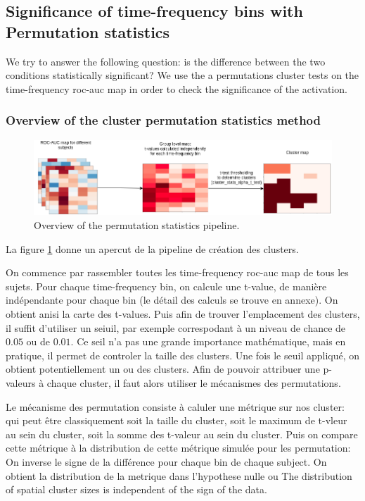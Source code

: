 \subsection{Significance of time-frequency bins with Permutation statistics}

We try to answer the following question: is the difference between
the two conditions statistically significant? We use the a permutations
cluster tests on the time-frequency roc-auc map in order to check the significance of the activation.

\subsubsection{Overview of the cluster permutation statistics method}

\begin{figure}[ht]
    \centering
    \includegraphics[width=15cm]{images_report/sensor/Permutation_statistics.png}
    \caption[Overview of the permutation statistics pipeline.]%
    {Overview of the permutation statistics pipeline.}
    \label{permutation_statistics_pipeline}
\end{figure}

La figure \ref{permutation_statistics_pipeline} donne un apercut de la pipeline de création des clusters.

On commence par rassembler toutes les time-frequency roc-auc map de tous les sujets. Pour chaque time-frequency bin, on calcule une t-value, de manière indépendante pour chaque bin (le détail des calculs se trouve en annexe). On obtient anisi la carte des t-values. Puis afin de trouver l'emplacement des clusters, il suffit d'utiliser un seiuil, par exemple correspodant à un niveau de chance de $0.05$ ou de $0.01$. Ce seil n'a pas une grande importance mathématique, mais en pratique, il permet de controler la taille des clusters. Une fois le seuil appliqué, on obtient potentiellement un ou des clusters. Afin de pouvoir attribuer une p-valeurs à chaque cluster, il faut alors utiliser le mécanismes des permutations.

Le mécanisme des permutation consiste à caluler une métrique sur nos cluster: qui peut être classiquement soit la taille du cluster, soit le maximum de t-vleur au sein du cluster, soit la somme des t-valeur au sein du cluster. Puis on compare cette métrique à la distribution de cette métrique simulée pour les permutation:
On inverse le signe de la différence pour chaque bin de chaque subject. On obtient la distribution de la metrique dans l'hypothese nulle ou The distribution of spatial cluster sizes is independent of the sign of the data.


